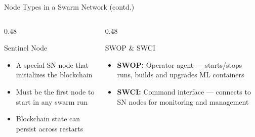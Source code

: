 \documentclass[aspectratio=169]{beamer}
\begin{document}
\begin{frame}{Node Types in a Swarm Network (contd.)}
    \begin{columns}[T]
        \begin{column}{0.48\textwidth}
            \begin{block}{Sentinel Node}
                \begin{itemize}
                    \item A special SN node that initializes the blockchain
                    \item Must be the first node to start in any swarm run
                    \item Blockchain state can persist across restarts
                \end{itemize}
            \end{block}
        \end{column}
        \begin{column}{0.48\textwidth}
            \begin{block}{SWOP \& SWCI}
                \begin{itemize}
                    \item \textbf{SWOP:} Operator agent — starts/stops runs, builds and upgrades ML containers
                    \item \textbf{SWCI:} Command interface — connects to SN nodes for monitoring and management
                \end{itemize}
            \end{block}
        \end{column}
    \end{columns}
\end{frame}
\end{document}
